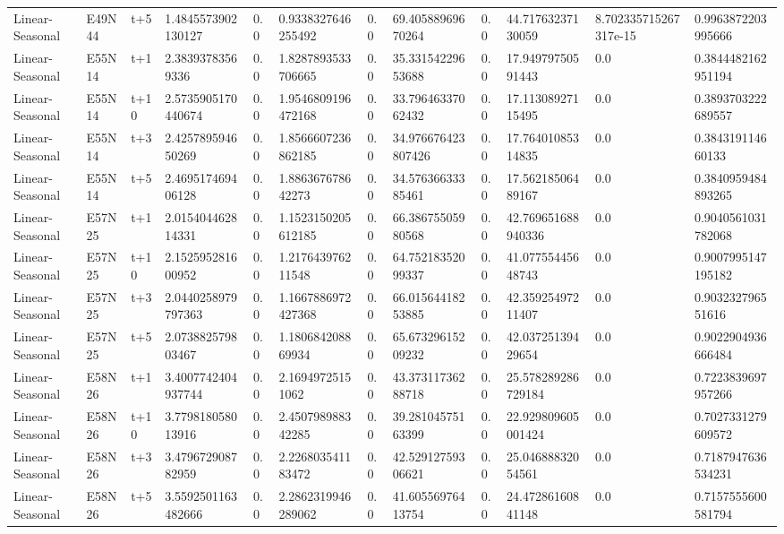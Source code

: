 \begin{landscape}
\begin{longtable}{llllllllllll}
Linear-Seasonal & E49N44 & t+5 & 1.4845573902130127 & 0.0 & 0.9338327646255492 & 0.0 & 69.40588969670264 & 0.0 & 44.71763237130059 & 8.702335715267317e-15 & 0.9963872203995666 \\
Linear-Seasonal & E55N14 & t+1 & 2.38393783569336 & 0.0 & 1.8287893533706665 & 0.0 & 35.33154229653688 & 0.0 & 17.94979750591443 & 0.0 & 0.3844482162951194 \\
Linear-Seasonal & E55N14 & t+10 & 2.5735905170440674 & 0.0 & 1.9546809196472168 & 0.0 & 33.79646337062432 & 0.0 & 17.11308927115495 & 0.0 & 0.3893703222689557 \\
Linear-Seasonal & E55N14 & t+3 & 2.425789594650269 & 0.0 & 1.8566607236862185 & 0.0 & 34.976676423807426 & 0.0 & 17.76401085314835 & 0.0 & 0.384319114660133 \\
Linear-Seasonal & E55N14 & t+5 & 2.469517469406128 & 0.0 & 1.886367678642273 & 0.0 & 34.57636633385461 & 0.0 & 17.56218506489167 & 0.0 & 0.3840959484893265 \\
Linear-Seasonal & E57N25 & t+1 & 2.015404462814331 & 0.0 & 1.1523150205612185 & 0.0 & 66.38675505980568 & 0.0 & 42.769651688940336 & 0.0 & 0.9040561031782068 \\
Linear-Seasonal & E57N25 & t+10 & 2.152595281600952 & 0.0 & 1.217643976211548 & 0.0 & 64.75218352099337 & 0.0 & 41.07755445648743 & 0.0 & 0.9007995147195182 \\
Linear-Seasonal & E57N25 & t+3 & 2.0440258979797363 & 0.0 & 1.1667886972427368 & 0.0 & 66.01564418253885 & 0.0 & 42.35925497211407 & 0.0 & 0.903232796551616 \\
Linear-Seasonal & E57N25 & t+5 & 2.073882579803467 & 0.0 & 1.180684208869934 & 0.0 & 65.67329615209232 & 0.0 & 42.03725139429654 & 0.0 & 0.9022904936666484 \\
Linear-Seasonal & E58N26 & t+1 & 3.4007742404937744 & 0.0 & 2.16949725151062 & 0.0 & 43.37311736288718 & 0.0 & 25.578289286729184 & 0.0 & 0.7223839697957266 \\
Linear-Seasonal & E58N26 & t+10 & 3.779818058013916 & 0.0 & 2.450798988342285 & 0.0 & 39.28104575163399 & 0.0 & 22.929809605001424 & 0.0 & 0.7027331279609572 \\
Linear-Seasonal & E58N26 & t+3 & 3.479672908782959 & 0.0 & 2.226803541183472 & 0.0 & 42.52912759306621 & 0.0 & 25.04688832054561 & 0.0 & 0.7187947636534231 \\
Linear-Seasonal & E58N26 & t+5 & 3.5592501163482666 & 0.0 & 2.2862319946289062 & 0.0 & 41.60556976413754 & 0.0 & 24.47286160841148 & 0.0 & 0.7157555600581794 \\

\end{longtable}
\end{landscape}
